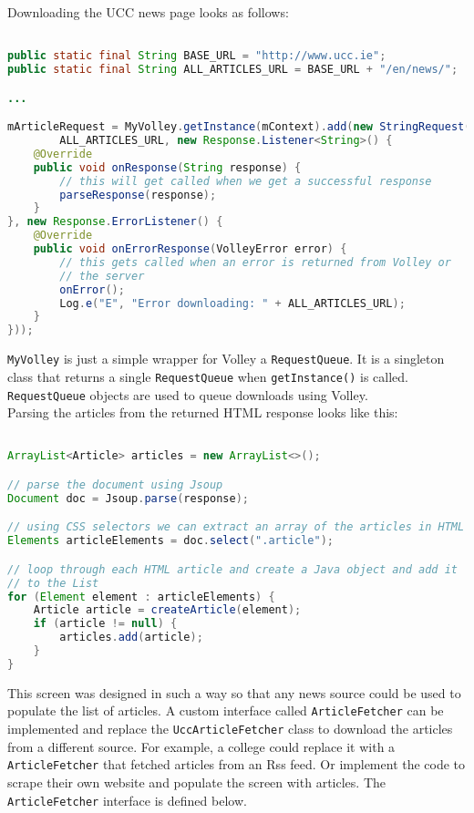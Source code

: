 Downloading the UCC news page looks as follows:
\begin{lstlisting}[language=Java]

public static final String BASE_URL = "http://www.ucc.ie";
public static final String ALL_ARTICLES_URL = BASE_URL + "/en/news/";

...

mArticleRequest = MyVolley.getInstance(mContext).add(new StringRequest(
        ALL_ARTICLES_URL, new Response.Listener<String>() {
    @Override
    public void onResponse(String response) {
        // this will get called when we get a successful response
        parseResponse(response);
    }
}, new Response.ErrorListener() {
    @Override
    public void onErrorResponse(VolleyError error) {
        // this gets called when an error is returned from Volley or
        // the server
        onError();
        Log.e("E", "Error downloading: " + ALL_ARTICLES_URL);
    }
}));

\end{lstlisting}

\texttt{MyVolley} is just a simple wrapper for Volley a \texttt{RequestQueue}.
It is a singleton class that returns a single \texttt{RequestQueue} when 
\texttt{getInstance()} is called. \texttt{RequestQueue} objects are used to
queue downloads using Volley.\\
Parsing the articles from the returned HTML response looks like this:

\begin{lstlisting}[language=Java]

ArrayList<Article> articles = new ArrayList<>();

// parse the document using Jsoup
Document doc = Jsoup.parse(response);

// using CSS selectors we can extract an array of the articles in HTML
Elements articleElements = doc.select(".article");

// loop through each HTML article and create a Java object and add it
// to the List
for (Element element : articleElements) {
    Article article = createArticle(element);
    if (article != null) {
        articles.add(article);
    }
}

\end{lstlisting}

This screen was designed in such a way so that any news source could be used to
populate the list of articles. A custom interface called \texttt{ArticleFetcher}
can be implemented and replace the \texttt{UccArticleFetcher} class to download
the articles from a different source. For example, a college could replace it
with a \texttt{ArticleFetcher} that fetched articles from an Rss feed. Or
implement the code to scrape their own website and populate the screen with
articles. The \texttt{ArticleFetcher} interface is defined below.

